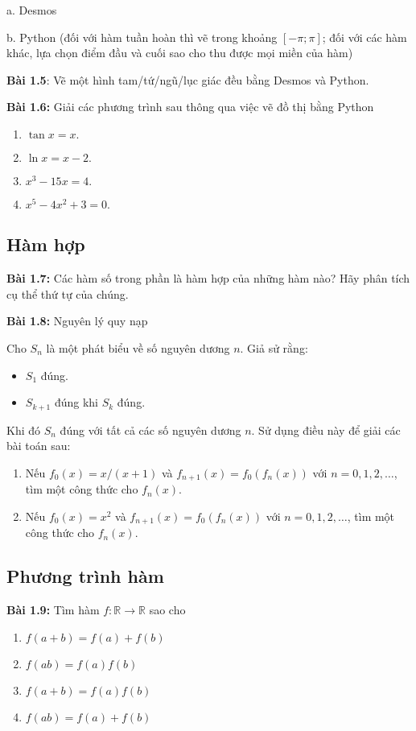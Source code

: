 a. Desmos 
\vspace{5pt}

b. Python (đối với hàm tuần hoàn thì vẽ trong khoảng $[-\pi;\pi]$; đối với các hàm khác, lựa chọn điểm đầu và cuối sao cho thu được mọi miền của hàm)
\vspace{5pt}

\textbf{Bài 1.5}: Vẽ một hình tam/tứ/ngũ/lục giác đều bằng Desmos và Python.
\vspace{5pt}

\textbf{Bài 1.6:} Giải các phương trình sau thông qua việc vẽ đồ thị bằng Python
\begin{enumerate}[label=(\alph*)]
    \item $\tan x= x.$
    \item $\ln x = x-2.$
    \item $x^3 -15x =4.$
    \item $x^5 -4x^2 +3=0.$
\end{enumerate}
\subsection*{Hàm hợp}

\textbf{Bài 1.7:} Các hàm số trong phần là hàm hợp của những hàm nào? Hãy phân tích cụ thể thứ tự của chúng.
\vspace{5pt}

\textbf{Bài 1.8:} Nguyên lý quy nạp\newline

Cho $S_n$ là một phát biểu về số nguyên dương $n$. Giả sử rằng:
\begin{itemize}
    \item $S_1$ đúng.
    \item $S_{k+1}$ đúng khi $S_k$ đúng.
\end{itemize}
Khi đó $S_n$ đúng với tất cả các số nguyên dương $n$.\newline
Sử dụng điều này để giải các bài toán sau:
\begin{enumerate}[label=(\alph*)]
    \item Nếu $f_0(x) =x/(x+1)$ và $f_{n+1}(x)=f_0(f_n(x))$ với $n=0, 1, 2,\dots$, tìm một công thức cho $f_n(x)$.
\item Nếu $f_0(x) =x^2$ và $f_{n+1}(x)=f_0(f_n(x))$ với $n=0, 1, 2,\dots$, tìm một công thức cho $f_n(x)$.
\end{enumerate}
\vspace{5pt}
\subsection*{Phương trình hàm}
\textbf{Bài 1.9:} Tìm hàm \(f: \mathbb{R}\rightarrow\mathbb{R}\) sao cho
\begin{enumerate}[label=(\alph*)]
    \item \(f(a+b)=f(a)+f(b)\)
    \item \(f(ab)=f(a)f(b)\)
    \item \(f(a+b)=f(a)f(b)\)
    \item \(f(ab)=f(a)+f(b)\)
\end{enumerate}

